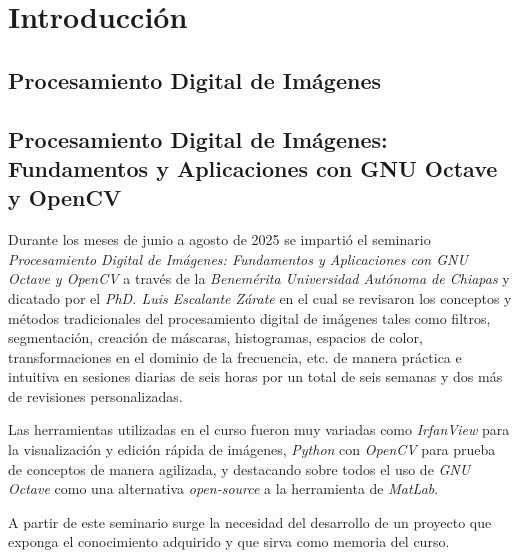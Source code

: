 \chapter{Introducción}

\section{Procesamiento Digital de Imágenes}

\section{Procesamiento Digital de Imágenes: Fundamentos y Aplicaciones con GNU Octave y OpenCV}
Durante los meses de junio a agosto de 2025 se impartió el seminario \textit{Procesamiento Digital de Imágenes: Fundamentos y Aplicaciones con GNU Octave y OpenCV} a través de la \textit{Benemérita Universidad Autónoma de Chiapas} y dicatado por el \textit{PhD. Luis Escalante Zárate} en el cual se revisaron los conceptos y métodos tradicionales del procesamiento digital de imágenes tales como filtros, segmentación, creación de máscaras, histogramas, espacios de color, transformaciones en el dominio de la frecuencia, etc. de manera práctica e intuitiva en sesiones diarias de seis horas por un total de seis semanas y dos más de revisiones personalizadas.

Las herramientas utilizadas en el curso fueron muy variadas como \textit{IrfanView} para la visualización y edición rápida de imágenes, \textit{Python} con \textit{OpenCV} para prueba de conceptos de manera agilizada, y destacando sobre todos el uso de \textit{GNU Octave} como una alternativa \textit{open-source} a la herramienta de \textit{MatLab}.

A partir de este seminario surge la necesidad del desarrollo de un proyecto que exponga el conocimiento adquirido y que sirva como memoria del curso.